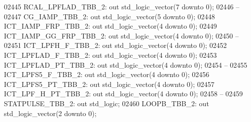 \begin{DoxyCode}
02445     RCAL\_LPFLAD\_TBB\_2:  \textcolor{keywordflow}{out} \textcolor{comment}{std\_logic\_vector}(\textcolor{vhdllogic}{}\textcolor{vhdllogic}{7} \textcolor{keywordflow}{downto} \textcolor{vhdllogic}{}\textcolor{vhdllogic}{0});
02446 \textcolor{keyword}{    --}
02447     CG\_IAMP\_TBB\_2:  \textcolor{keywordflow}{out} \textcolor{comment}{std\_logic\_vector}(\textcolor{vhdllogic}{}\textcolor{vhdllogic}{5} \textcolor{keywordflow}{downto} \textcolor{vhdllogic}{}\textcolor{vhdllogic}{0});
02448     ICT\_IAMP\_FRP\_TBB\_2: \textcolor{keywordflow}{out} \textcolor{comment}{std\_logic\_vector}(\textcolor{vhdllogic}{}\textcolor{vhdllogic}{4} \textcolor{keywordflow}{downto} \textcolor{vhdllogic}{}\textcolor{vhdllogic}{0});
02449     ICT\_IAMP\_GG\_FRP\_TBB\_2:  \textcolor{keywordflow}{out} \textcolor{comment}{std\_logic\_vector}(\textcolor{vhdllogic}{}\textcolor{vhdllogic}{4} \textcolor{keywordflow}{downto} \textcolor{vhdllogic}{}\textcolor{vhdllogic}{0});
02450 \textcolor{keyword}{    --}
02451     ICT\_LPFH\_F\_TBB\_2:   \textcolor{keywordflow}{out} \textcolor{comment}{std\_logic\_vector}(\textcolor{vhdllogic}{}\textcolor{vhdllogic}{4} \textcolor{keywordflow}{downto} \textcolor{vhdllogic}{}\textcolor{vhdllogic}{0});
02452     ICT\_LPFLAD\_F\_TBB\_2: \textcolor{keywordflow}{out} \textcolor{comment}{std\_logic\_vector}(\textcolor{vhdllogic}{}\textcolor{vhdllogic}{4} \textcolor{keywordflow}{downto} \textcolor{vhdllogic}{}\textcolor{vhdllogic}{0});
02453     ICT\_LPFLAD\_PT\_TBB\_2:    \textcolor{keywordflow}{out} \textcolor{comment}{std\_logic\_vector}(\textcolor{vhdllogic}{}\textcolor{vhdllogic}{4} \textcolor{keywordflow}{downto} \textcolor{vhdllogic}{}\textcolor{vhdllogic}{0});
02454 \textcolor{keyword}{    --}
02455     ICT\_LPFS5\_F\_TBB\_2:  \textcolor{keywordflow}{out} \textcolor{comment}{std\_logic\_vector}(\textcolor{vhdllogic}{}\textcolor{vhdllogic}{4} \textcolor{keywordflow}{downto} \textcolor{vhdllogic}{}\textcolor{vhdllogic}{0});
02456     ICT\_LPFS5\_PT\_TBB\_2: \textcolor{keywordflow}{out} \textcolor{comment}{std\_logic\_vector}(\textcolor{vhdllogic}{}\textcolor{vhdllogic}{4} \textcolor{keywordflow}{downto} \textcolor{vhdllogic}{}\textcolor{vhdllogic}{0});
02457     ICT\_LPF\_H\_PT\_TBB\_2: \textcolor{keywordflow}{out} \textcolor{comment}{std\_logic\_vector}(\textcolor{vhdllogic}{}\textcolor{vhdllogic}{4} \textcolor{keywordflow}{downto} \textcolor{vhdllogic}{}\textcolor{vhdllogic}{0});
02458 \textcolor{keyword}{    --}
02459     STATPULSE\_TBB\_2:    \textcolor{keywordflow}{out} \textcolor{comment}{std\_logic};
02460     LOOPB\_TBB\_2:    \textcolor{keywordflow}{out} \textcolor{comment}{std\_logic\_vector}(\textcolor{vhdllogic}{}\textcolor{vhdllogic}{2} \textcolor{keywordflow}{downto} \textcolor{vhdllogic}{}\textcolor{vhdllogic}{0});

\end{DoxyCode}
